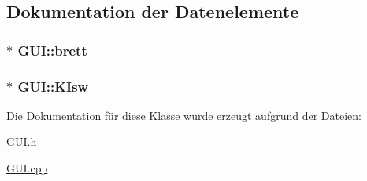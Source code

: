   

\subsection{Dokumentation der Datenelemente}
\hypertarget{class_g_u_i_ad27ec30e361c6b18ba0b03f4eb3c2697}{}
\subsubsection[{brett}]{$\ast$ G\+U\+I\+::brett\hspace{0.3cm}{\ttfamily [private]}}\label{class_g_u_i_ad27ec30e361c6b18ba0b03f4eb3c2697}
\hypertarget{class_g_u_i_a859788c2a71895514783423c305cf886}{}
\subsubsection[{K\+Isw}]{$\ast$ G\+U\+I\+::\+K\+Isw\hspace{0.3cm}{\ttfamily [private]}}\label{class_g_u_i_a859788c2a71895514783423c305cf886}


Die Dokumentation für diese Klasse wurde erzeugt aufgrund der Dateien\+:\begin{DoxyCompactItemize}
\item 
\hyperlink{_g_u_i_8h}{G\+U\+I.\+h}\item 
\hyperlink{_g_u_i_8cpp}{G\+U\+I.\+cpp}\end{DoxyCompactItemize}

